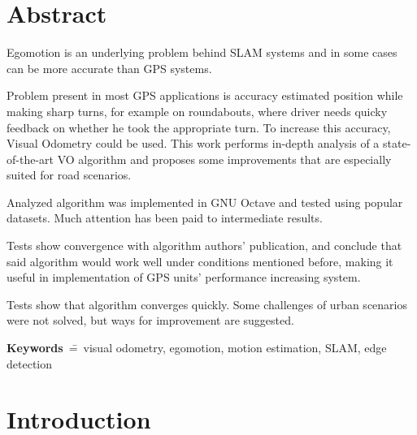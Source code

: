 
\chapter*{Abstract}


Egomotion is an underlying problem behind SLAM systems and in some cases can be more accurate than GPS systems.

Problem present in most GPS applications is accuracy estimated position while making sharp turns, for example on roundabouts, where driver needs quicky feedback on whether he took the appropriate turn. To increase this accuracy, Visual Odometry could be used. This work performs in-depth analysis of a state-of-the-art VO algorithm and proposes some improvements that are especially suited for road scenarios.



Analyzed algorithm was implemented in GNU Octave and tested using popular datasets. Much attention has been paid to intermediate results.

Tests show convergence with algorithm authors' publication, and conclude that said algorithm would work well under conditions mentioned before, making it useful in implementation of GPS units' performance increasing system.

Tests show that algorithm converges quickly. Some challenges of urban scenarios were not solved, but ways for improvement are suggested.


\textbf{Keywords}~\==~visual odometry, egomotion, motion estimation, SLAM, edge detection

\chapter*{Introduction}


